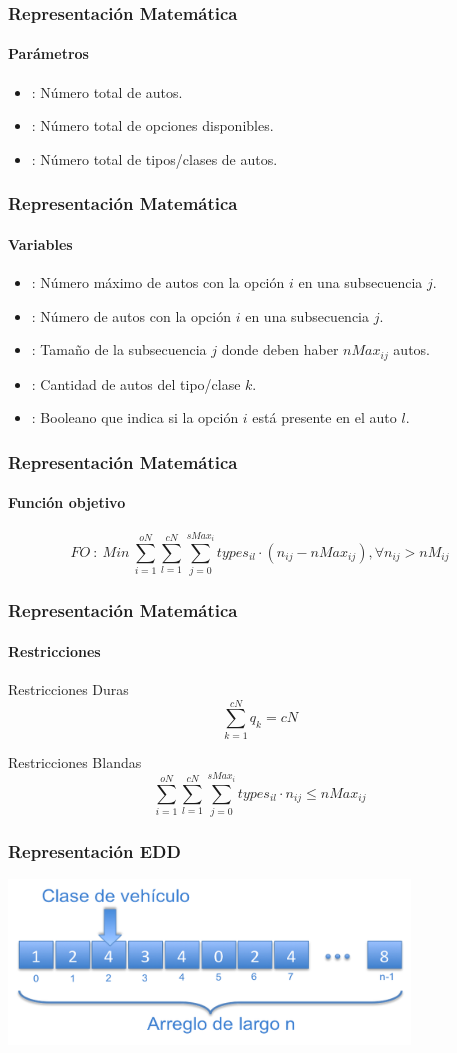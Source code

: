 
\frame
{
\frametitle{Representación Matemática}
\framesubtitle{Parámetros}
    \begin{itemize}
        \item {}: Número total de autos.
        \item {}: Número total de opciones disponibles.
        \item {}: Número total de tipos/clases de autos.
    \end{itemize}
}

\frame
{
\frametitle{Representación Matemática}
\framesubtitle{Variables}
    \begin{itemize}
        \item {}: Número máximo de autos con la opción $i$ en una subsecuencia $j$.
        \item {}: Número de autos con la opción $i$ en una subsecuencia $j$.
        \item {}: Tamaño de la subsecuencia $j$ donde deben haber $nMax_{ij}$ autos.
        \item {}: Cantidad de autos del tipo/clase $k$.
        \item {}: Booleano que indica si la opción $i$ está presente en el auto $l$.
    \end{itemize}
}

\frame
{
\frametitle{Representación Matemática}
\framesubtitle{Función objetivo}

    $$FO\ :\ Min\ \sum\limits_{i=1}^{oN} \sum\limits_{l=1}^{cN} \sum\limits_{j=0}^{sMax_{i}} types_{il}\cdot (n_{ij} - nMax_{ij}), \forall n_{ij} > nM_{ij}$$
}

\frame
{
\frametitle{Representación Matemática}
\framesubtitle{Restricciones}

Restricciones Duras
    $$\sum\limits_{k=1}^{cN} q_{k} = cN$$

Restricciones Blandas
    $$\sum\limits_{i=1}^{oN} \sum\limits_{l=1}^{cN} \sum\limits_{j=0}^{sMax_{i}} types_{il}\cdot n_{ij} \leq nMax_{ij}$$
}

\frame
{
\frametitle{Representación EDD}
\begin{center}
	\includegraphics[width=0.8\textwidth]{img/representacion}
\end{center}
}


